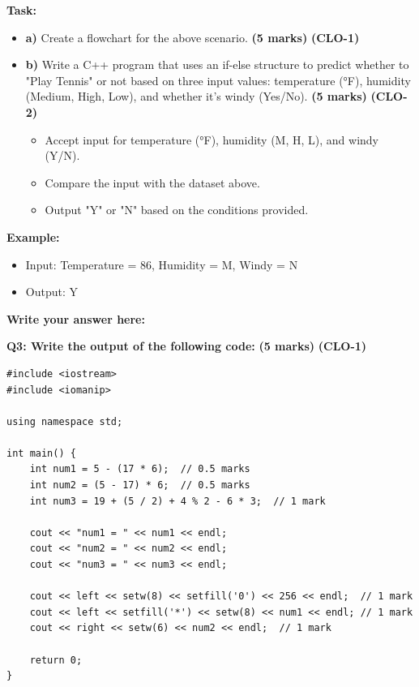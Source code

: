 \documentclass[a4paper,12pt]{article}
\begin{document}
\textbf{Task:}
\begin{itemize}
    \item \textbf{a)} Create a flowchart for the above scenario. \hfill \textbf{(5 marks)} \textbf{(CLO-1)}
    \item \textbf{b)} Write a C++ program that uses an if-else structure to predict whether to "Play Tennis" or not based on three input values: temperature (°F), humidity (Medium, High, Low), and whether it's windy (Yes/No). \hfill \textbf{(5 marks)} \textbf{(CLO-2)}
    \begin{itemize}
        \item Accept input for temperature (°F), humidity (M, H, L), and windy (Y/N).
        \item Compare the input with the dataset above.
        \item Output "Y" or "N" based on the conditions provided.
    \end{itemize}
\end{itemize}

\textbf{Example:}
\begin{itemize}
    \item Input: Temperature = 86, Humidity = M, Windy = N
    \item Output: Y
\end{itemize}

\vspace{0.5cm}
\textbf{Write your answer here:}
\begin{tcolorbox}[colframe=black, colback=white, width=\textwidth, height=12cm, valign=center]
\end{tcolorbox}

\vspace{0.5cm}

\textbf{Q3: Write the output of the following code:} \hfill \textbf{(5 marks)} \textbf{(CLO-1)}

\begin{verbatim}
#include <iostream>
#include <iomanip>

using namespace std;

int main() {
    int num1 = 5 - (17 * 6);  // 0.5 marks
    int num2 = (5 - 17) * 6;  // 0.5 marks
    int num3 = 19 + (5 / 2) + 4 % 2 - 6 * 3;  // 1 mark

    cout << "num1 = " << num1 << endl;
    cout << "num2 = " << num2 << endl;
    cout << "num3 = " << num3 << endl;

    cout << left << setw(8) << setfill('0') << 256 << endl;  // 1 mark
    cout << left << setfill('*') << setw(8) << num1 << endl; // 1 mark
    cout << right << setw(6) << num2 << endl;  // 1 mark

    return 0;
}
\end{verbatim}
\end{document}
